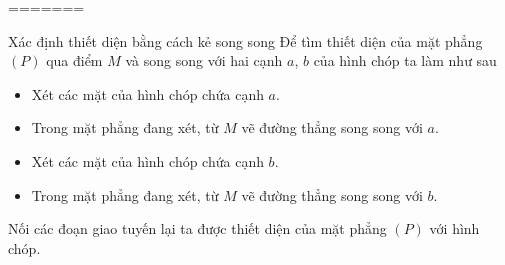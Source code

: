 =======
\begin{dang}{Xác định thiết diện bằng cách kẻ song song}
	Để tìm thiết diện của mặt phẳng $(P)$ qua điểm $M$ và song song với hai cạnh $a$, $b$ của hình chóp ta làm như sau
	\begin{itemize}
		\item Xét các mặt của hình chóp chứa cạnh $a$.
		\item Trong mặt phẳng đang xét, từ $M$ vẽ đường thẳng song song với $a$.
		\item Xét các mặt của hình chóp chứa cạnh $b$.
		\item Trong mặt phẳng đang xét, từ $M$ vẽ đường thẳng song song với $b$.
	\end{itemize}
	Nối các đoạn giao tuyến lại ta được thiết diện của mặt phẳng $(P)$ với hình chóp.
\end{dang}
